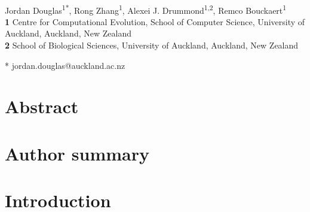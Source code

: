 \documentclass[10pt,letterpaper]{article}
\begin{document}
\vspace*{0.2in}

\begin{flushleft}
{\Large
\textbf{} %
}
\newline
\\
Jordan Douglas\textsuperscript{1*},
Rong Zhang\textsuperscript{1},
Alexei J. Drummond\textsuperscript{1,2},
Remco Bouckaert\textsuperscript{1}
\\
\bigskip
\textbf{1} Centre for Computational Evolution, School of Computer Science, University of Auckland, Auckland, New Zealand\\
\textbf{2} School of Biological Sciences, University of Auckland, Auckland, New Zealand
\\
\bigskip


* jordan.douglas@auckland.ac.nz


\end{flushleft}
\section*{Abstract}




\section*{Author summary}




\linenumbers

\section*{Introduction}
\end{document}
